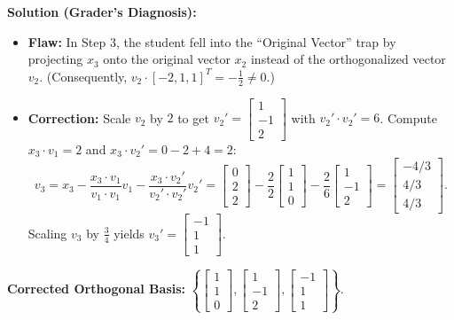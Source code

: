 \documentclass[11pt, letterpaper]{article}
\theoremstyle{definition}
\theoremstyle{remark}
\begin{document}
\textbf{Solution (Grader's Diagnosis):}
\begin{itemize}
    \item \textbf{Flaw:} In Step 3, the student fell into the ``Original Vector'' trap by projecting $x_3$ onto the original vector $x_2$ instead of the orthogonalized vector $v_2$. (Consequently, $v_2 \cdot [-2, 1, 1]^T = -\frac{1}{2} \neq 0$.)
    \item \textbf{Correction:} Scale $v_2$ by $2$ to get $v_2' = \begin{bmatrix} 1 \\ -1 \\ 2 \end{bmatrix}$ with $v_2' \cdot v_2' = 6$. Compute $x_3 \cdot v_1 = 2$ and $x_3 \cdot v_2' = 0 - 2 + 4 = 2$:
    \[
        v_3 = x_3 - \frac{x_3 \cdot v_1}{v_1 \cdot v_1} v_1 - \frac{x_3 \cdot v_2'}{v_2' \cdot v_2'} v_2' = \begin{bmatrix} 0 \\ 2 \\ 2 \end{bmatrix} - \frac{2}{2}\begin{bmatrix} 1 \\ 1 \\ 0 \end{bmatrix} - \frac{2}{6}\begin{bmatrix} 1 \\ -1 \\ 2 \end{bmatrix} = \begin{bmatrix} -4/3 \\ 4/3 \\ 4/3 \end{bmatrix}.
    \]
    Scaling $v_3$ by $\frac{3}{4}$ yields $v_3' = \begin{bmatrix} -1 \\ 1 \\ 1 \end{bmatrix}$.
\end{itemize}
\textbf{Corrected Orthogonal Basis:} $\left\{ \begin{bmatrix} 1 \\ 1 \\ 0 \end{bmatrix}, \begin{bmatrix} 1 \\ -1 \\ 2 \end{bmatrix}, \begin{bmatrix} -1 \\ 1 \\ 1 \end{bmatrix} \right\}$.
\end{document}
